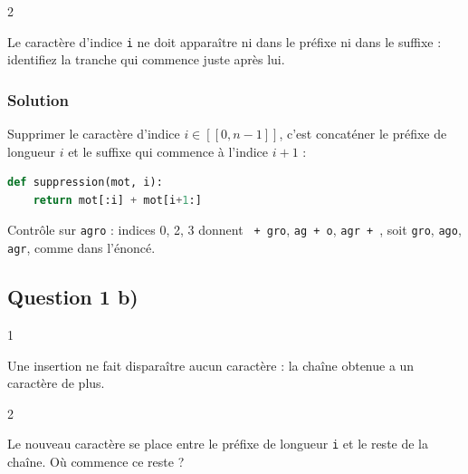 \documentclass[11pt,a4paper]{article}
\begin{document}
\begin{indication}{2}

Le caractère d'indice \texttt{i} ne doit apparaître ni dans le préfixe ni dans le suffixe : identifiez la tranche qui commence juste après lui.

\end{indication}

\hypertarget{solution}{%
\subsubsection{Solution}\label{solution}}

Supprimer le caractère d'indice \(i\in[\![0,n-1]\!]\), c'est concaténer le préfixe de longueur \(i\) et le suffixe qui commence à l'indice \(i+1\) :

\begin{lstlisting}[language=Python]
def suppression(mot, i):
    return mot[:i] + mot[i+1:]
\end{lstlisting}

Contrôle sur \texttt{\textquotesingle{}agro\textquotesingle{}} : indices 0, 2, 3 donnent \texttt{\textquotesingle{}\textquotesingle{}\ +\ \textquotesingle{}gro\textquotesingle{}}, \texttt{\textquotesingle{}ag\textquotesingle{}\ +\ \textquotesingle{}o\textquotesingle{}}, \texttt{\textquotesingle{}agr\textquotesingle{}\ +\ \textquotesingle{}\textquotesingle{}}, soit \texttt{\textquotesingle{}gro\textquotesingle{}}, \texttt{\textquotesingle{}ago\textquotesingle{}}, \texttt{\textquotesingle{}agr\textquotesingle{}}, comme dans l'énoncé.

\hypertarget{question-1-b}{%
\subsection{Question 1 b)}\label{question-1-b}}

\begin{indication}{1}

Une insertion ne fait disparaître aucun caractère : la chaîne obtenue a un caractère de plus.

\end{indication}

\begin{indication}{2}

Le nouveau caractère se place entre le préfixe de longueur \texttt{i} et le reste de la chaîne. Où commence ce reste ?

\end{indication}
\end{document}
